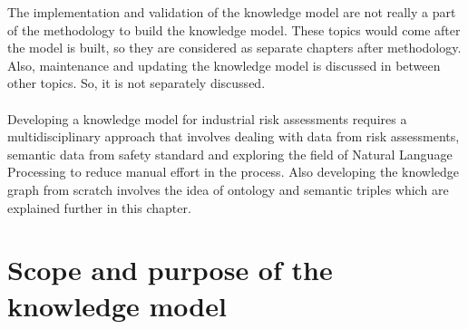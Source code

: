 The implementation and validation of the knowledge model are not really a part of the methodology to build the knowledge model. These topics would come after the model is built, so they are considered as separate chapters after methodology. Also, maintenance and updating the knowledge model is discussed in between other topics. So, it is not separately discussed.

\paragraph{} Developing a knowledge model for industrial risk assessments requires a multidisciplinary approach that involves dealing with data from risk assessments, semantic data from safety standard and exploring the field of Natural Language Processing to reduce manual effort in the process. Also developing the knowledge graph from scratch involves the idea of ontology and semantic triples which are explained further in this chapter.

\section{Scope and purpose of the knowledge model} \label{scope}

